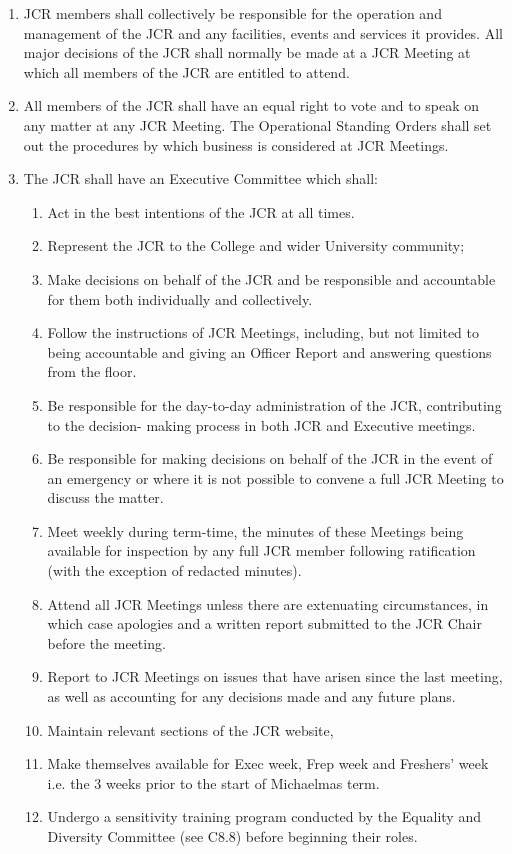 \begin{enumerate}
    \item JCR members shall collectively be responsible for the operation and management of the JCR and any facilities, events and services it provides. All major decisions of the JCR shall normally be made at a JCR Meeting at which all members of the JCR are entitled to attend.
    \item All members of the JCR shall have an equal right to vote and to speak on any matter at any JCR Meeting. The Operational Standing Orders shall set out the procedures by which business is considered at JCR Meetings.
    \item The JCR shall have an Executive Committee which shall:
        \begin{enumerate}
            \item Act in the best intentions of the JCR at all times.
            \item Represent the JCR to the College and wider University community;
            \item Make decisions on behalf of the JCR and be responsible and accountable for them both individually and collectively.
            \item Follow the instructions of JCR Meetings, including, but not limited to being accountable and giving an Officer Report and answering questions from the floor.
            \item Be responsible for the day-to-day administration of the JCR, contributing to the decision- making process in both JCR and Executive meetings.
            \item Be responsible for making decisions on behalf of the JCR in the event of an emergency or where it is not possible to convene a full JCR Meeting to discuss the matter.
            \item Meet weekly during term-time, the minutes of these Meetings being available for inspection by any full JCR member following ratification (with the exception of redacted minutes).
            \item Attend all JCR Meetings unless there are extenuating circumstances, in which case apologies and a written report submitted to the JCR Chair before the meeting.
            \item Report to JCR Meetings on issues that have arisen since the last meeting, as well as accounting for any decisions made and any future plans.
            \item Maintain relevant sections of the JCR website,
            \item Make themselves available for Exec week, Frep week and Freshers’ week i.e. the 3 weeks prior to the start of Michaelmas term.
            \item Undergo a sensitivity training program conducted by the Equality and Diversity Committee (see C8.8) 
before beginning their roles.


\end{enumerate}
\end{enumerate}
